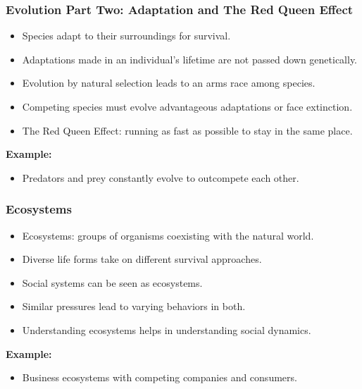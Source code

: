 \begin{frame}[fragile]\frametitle{Evolution Part Two: Adaptation and The Red Queen Effect}
\begin{itemize}
    \item Species adapt to their surroundings for survival.
    \item Adaptations made in an individual’s lifetime are not passed down genetically.
    \item Evolution by natural selection leads to an arms race among species.
    \item Competing species must evolve advantageous adaptations or face extinction.
    \item The Red Queen Effect: running as fast as possible to stay in the same place.
\end{itemize}
\textbf{Example:}
\begin{itemize}
    \item Predators and prey constantly evolve to outcompete each other.
\end{itemize}
\end{frame}

\begin{frame}[fragile]\frametitle{Ecosystems}
\begin{itemize}
    \item Ecosystems: groups of organisms coexisting with the natural world.
    \item Diverse life forms take on different survival approaches.
    \item Social systems can be seen as ecosystems.
    \item Similar pressures lead to varying behaviors in both.
    \item Understanding ecosystems helps in understanding social dynamics.
\end{itemize}
\textbf{Example:}
\begin{itemize}
    \item Business ecosystems with competing companies and consumers.
\end{itemize}
\end{frame}

